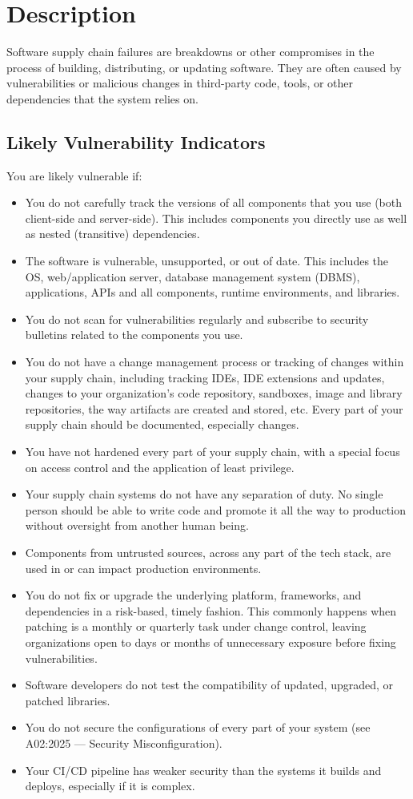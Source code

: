 \documentclass[11pt]{article}
\begin{document}
\section{Description}
Software supply chain failures are breakdowns or other compromises in the process of building, distributing, or updating software. They are often caused by vulnerabilities or malicious changes in third-party code, tools, or other dependencies that the system relies on.

\subsection{Likely Vulnerability Indicators}
You are likely vulnerable if:

\begin{itemize}
  \item You do not carefully track the versions of all components that you use (both client-side and server-side). This includes components you directly use as well as nested (transitive) dependencies.
  \item The software is vulnerable, unsupported, or out of date. This includes the OS, web/application server, database management system (DBMS), applications, APIs and all components, runtime environments, and libraries.
  \item You do not scan for vulnerabilities regularly and subscribe to security bulletins related to the components you use.
  \item You do not have a change management process or tracking of changes within your supply chain, including tracking IDEs, IDE extensions and updates, changes to your organization's code repository, sandboxes, image and library repositories, the way artifacts are created and stored, etc. Every part of your supply chain should be documented, especially changes.
  \item You have not hardened every part of your supply chain, with a special focus on access control and the application of least privilege.
  \item Your supply chain systems do not have any separation of duty. No single person should be able to write code and promote it all the way to production without oversight from another human being.
  \item Components from untrusted sources, across any part of the tech stack, are used in or can impact production environments.
  \item You do not fix or upgrade the underlying platform, frameworks, and dependencies in a risk-based, timely fashion. This commonly happens when patching is a monthly or quarterly task under change control, leaving organizations open to days or months of unnecessary exposure before fixing vulnerabilities.
  \item Software developers do not test the compatibility of updated, upgraded, or patched libraries.
  \item You do not secure the configurations of every part of your system (see A02:2025 --- Security Misconfiguration).
  \item Your CI/CD pipeline has weaker security than the systems it builds and deploys, especially if it is complex.
\end{itemize}
\end{document}
